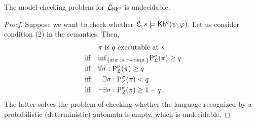 \begin{theorem}\label{th:mc-khp-undecidable}
The model-checking problem for $\mathcal{L}_{{\mathsf{Kh}}^q}$ is undecidable.
\end{theorem}

\begin{proof}
    Suppose we want to check whether $\mathfrak{L},s\models{\mathsf{Kh}}^q(\psi,\varphi)$. 
    Let us consider condition (2) in the semantics. Then,
    \begin{align}
        & \pi \text{ is $q$-executable at } s \\
        \text{ iff } \ \ &  \mathrm{inf}_{\{\sigma \mid \sigma \text{ is } \pi\text{-comp.}\}} \mathrm{P}^\sigma_{\mathfrak{L}}(\pi)\geq q \\ 
        \text{ iff } \ \ & \forall\sigma: \mathrm{P}^\sigma_{\mathfrak{L}}(\pi) \geq q \\ 
        \text{ iff } \ \ & \neg\exists\sigma: \mathrm{P}^\sigma_{\mathfrak{L}}(\pi) < q \\
        \text{ iff } \ \ & \neg\exists\sigma: \mathrm{P}^\sigma_{\mathfrak{L}}(\pi) \geq 1 - q
    \end{align}
    The latter solves the problem of checking whether the language recognized by a probabilistic (deterministic) automata is empty, which is undecidable.
\end{proof}